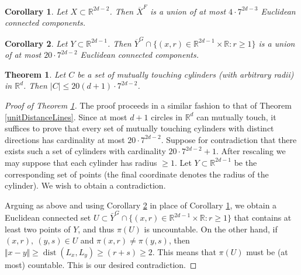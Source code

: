 \documentclass[10pt,a4paper]{amsart}
\newtheorem{thm}{Theorem}
\newtheorem{cor}{Corollary}
\newcommand{\RR}{\mathbb{R}}
\begin{document}
\begin{cor}\label{consequenceOfMilnorThom}
Let $X\subset\RR^{2d-2}$. Then $\overline X^F$ is a union of at most $4\cdot 7^{2d-3}$ Euclidean connected components.%
\end{cor}

\begin{cor}\label{consequenceOfBPR}
Let $Y\subset\RR^{2d-1}$. Then $\overline Y^G \cap \{(x,r)\in\RR^{2d-1}\times\RR\colon r \geq 1\}$ is a union of at most $20\cdot 7^{2d-2}$ Euclidean connected components.
\end{cor}

\begin{thm}\label{unitDistanceCylindersLines}
Let $C$ be a set of mutually touching cylinders (with arbitrary radii) in $\RR^d$. Then $|C|\leq 20(d+1)\cdot 7^{2d-2}$.
\end{thm}

\begin{proof}[Proof of Theorem \ref{unitDistanceCylindersLines}]
The proof proceeds in a similar fashion to that of Theorem \ref{unitDistanceLines}. Since at most $d+1$ circles in $\RR^d$ can mutually touch, it suffices to prove that every set of mutually touching cylinders with distinct directions has cardinality at most $20\cdot 7^{2d-2}$. Suppose for contradiction that there exists such a set of cylinders with cardinality $20\cdot 7^{2d-2}+1$. After rescaling we may suppose that each cylinder has radius $\geq 1$. Let $Y\subset\RR^{2d-1}$ be the corresponding set of points (the final coordinate denotes the radius of the cylinder). We wish to obtain a contradiction. 

Arguing as above and using Corollary \ref{consequenceOfBPR} in place of Corollary \ref{consequenceOfMilnorThom}, we obtain a Euclidean connected set $U\subset \bar Y^G \cap \{(x,r)\in\RR^{2d-1}\times\RR\colon r \geq 1\}$ that contains at least two points of $Y$, and thus $\pi(U)$ is uncountable. %
%
On the other hand, if $(x,r),\ (y,s)\in U$ and $\pi(x,r)\neq\pi(y,s)$, then $\Vert x-y\Vert \geq \operatorname{dist}(L_x, L_y) \geq (r+s)\geq 2$. This means that $\pi(U)$ must be (at most) countable. This is our desired contradiction.
\end{proof}
\end{document}
